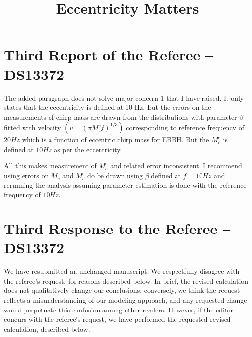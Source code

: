 \documentclass[a4paper]{scrreprt}
\title{Eccentricity Matters}
\begin{document}

\section{Third Report of the Referee -- DS13372}

The added paragraph does not solve major concern 1 that I have raised.
It only states that the eccentricity is defined at 10 Hz. But the
errors on the measurements of chirp mass are drawn from the
distributions with parameter $\beta$ fitted with velocity $(v = (\pi
M_c^{e} f)^{1/3})$ corresponding to reference frequency of $20 Hz$
which is a function of eccentric chirp mass for EBBH. But the $M_c^{e}$
is defined at $10 Hz$ as per the eccentricity.

All this makes measurement of $M_c^{e}$ and related error inconsistent.
I recommend using errors on $M_c$ and $M_c^{e}$ do be drawn using $\beta$
defined at $f = 10 Hz$ and rerunning the analysis assuming parameter
estimation is done with the reference frequency of $10 Hz$.

\section{Third Response to the Referee -- DS13372}


We have resubmitted an unchanged manuscript.  We respectfully disagree with the referee's request, for reasons described
below.  In brief, the revised calculation does not qualitatively change our conclusions; conversely, we think the
request reflects a misunderstanding of our modeling approach, and any requested change would perpetuate this confusion
among other readers.
However, if the editor concurs with the referee's request, we have performed the requested revised calculation,
described below.
\end{document}
